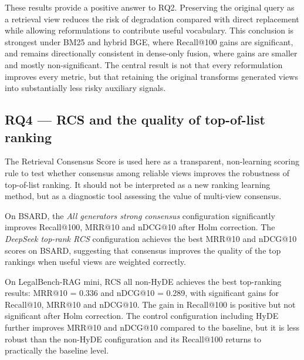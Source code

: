 \documentclass[a4paper,fleqn]{cas-dc}
\begin{document}
These results provide a positive answer to RQ2. Preserving
the original query as a retrieval view reduces the risk of
degradation compared with direct replacement while allowing
reformulations to contribute useful vocabulary. This conclusion
is strongest under BM25 and hybrid BGE, where Recall@100 gains
are significant, and remains directionally consistent in
dense-only fusion, where gains are smaller and mostly
non-significant. The central result is not that every
reformulation improves every metric, but that retaining the
original transforms generated views into substantially less
risky auxiliary signals.

\subsection{RQ4 --- RCS and the quality of top-of-list
ranking}
\label{sec:results-rq4}

The Retrieval Consensus Score is used here as a
transparent, non-learning scoring rule to
test whether consensus among reliable views improves the
robustness of top-of-list ranking. It should
not be interpreted as a new
ranking learning method, but as a
diagnostic tool assessing the value of multi-view consensus.

On BSARD, the \textit{All generators strong
consensus} configuration significantly improves Recall@100, MRR@10
and nDCG@10 after Holm correction. The
\textit{DeepSeek top-rank RCS} configuration achieves the best
MRR@10 and nDCG@10 scores on BSARD, suggesting that
consensus improves the quality of the top rankings
when useful views are weighted correctly.

On LegalBench-RAG mini, RCS all non-HyDE achieves the
best top-ranking results:
MRR@10 = 0.336 and nDCG@10 = 0.289, with significant
gains for Recall@10, MRR@10 and nDCG@10. The
gain in Recall@100 is positive but not significant
after Holm correction. The control configuration
including HyDE further improves MRR@10 and nDCG@10
compared to the baseline, but it is less robust than
the non-HyDE configuration and its Recall@100 returns
to practically the baseline level.
\end{document}
